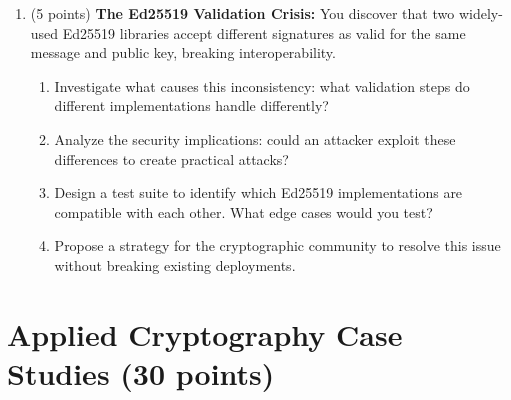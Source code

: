 \documentclass[10pt,a4paper,american]{exam}
\begin{document}
\begin{enumerate}
	\item (5 points) \textbf{The Ed25519 Validation Crisis:}
	      You discover that two widely-used Ed25519 libraries accept different signatures as valid for the same message and public key, breaking interoperability.
	      \begin{enumerate}
		      \item Investigate what causes this inconsistency: what validation steps do different implementations handle differently?
		      \item Analyze the security implications: could an attacker exploit these differences to create practical attacks?
		      \item Design a test suite to identify which Ed25519 implementations are compatible with each other. What edge cases would you test?
		      \item Propose a strategy for the cryptographic community to resolve this issue without breaking existing deployments.
	      \end{enumerate}
\end{enumerate}

\section{Applied Cryptography Case Studies (30 points)}
\end{document}

